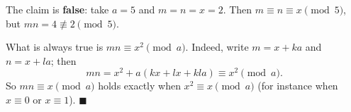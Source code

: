 The claim is \textbf{false}: take $a=5$ and $m=n=x=2$. Then $m\equiv n\equiv x\pmod5$, but $mn=4\not\equiv2\pmod5$.

What is always true is $mn\equiv x^2\pmod a$. Indeed, write $m=x+ka$ and $n=x+la$; then
\[mn=x^2+a(kx+lx+kla)\equiv x^2\pmod a.\]
So $mn\equiv x\pmod a$ holds exactly when $x^2\equiv x\pmod a$ (for instance when $x\equiv0$ or $x\equiv1$). $\blacksquare$
